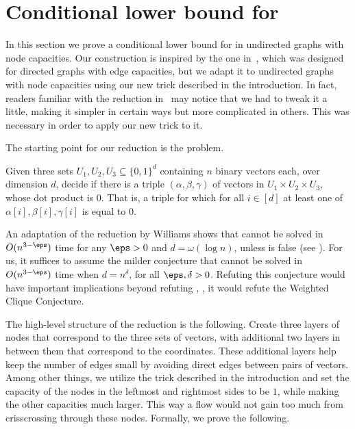 \section{Conditional lower bound for \APMF}\label{sec:lower}

In this section we prove a conditional lower bound for \APMF
in undirected graphs with node capacities.
Our construction is inspired by the one in~\cite{KT18}, which was designed for directed graphs with edge capacities, but we
%
adapt it to undirected graphs with node capacities %
%
using our new trick described in the introduction.
In fact, readers familiar with the reduction in~\cite{KT18} may notice that we had to tweak it a little, making it simpler in certain ways but more complicated in others.  This was necessary in order to apply our new trick
%
%
to it.

The starting point for our reduction is the \TOV problem.
\begin{definition}[\TOV]
Given three sets $U_1, U_2, U_3 \subseteq \{0,1\}^d$ containing $n$ binary vectors each, over dimension $d$, decide if there is a triple $(\alpha,\beta,\gamma)$ of vectors in $U_1 \times U_2 \times U_3$, whose dot product is $0$. That is, a triple for which for all $i \in [d]$ at least one of $\alpha[i],\beta[i],\gamma[i]$ is equal to $0$.
\end{definition}

An adaptation of the reduction by Williams \cite{Wil05} shows that  \TOV cannot be solved in $O(n^{3-\eps})$ time for any $\eps>0$ and $d=\omega(\log{n})$, unless \SETH is false (see \cite{ABV15}).
For us, it suffices to assume the milder conjecture that \TOV cannot be solved in  $O(n^{3-\eps})$ time when $d=n^{\delta}$, for all $\eps,\delta>0$.
Refuting this conjecture
%
would have    %
important implications beyond refuting \SETH \cite{GIKW17,ABDN18}, \eg, it
%
would refute  %
the Weighted Clique Conjecture.

The %
high-level   %
structure of the reduction is the
%
%
following.  Create  %
three layers of nodes that correspond to the three sets of vectors, with additional two layers in between them that correspond to the coordinates. These additional layers help keep the number of edges small by avoiding direct edges between pairs of vectors.
Among other things, we utilize the trick described in the introduction and set the capacity of the nodes in the leftmost and rightmost sides to be $1$, while making the other capacities much larger. This way a flow would not gain too much from crisscrossing through these nodes. Formally, we prove the following.


